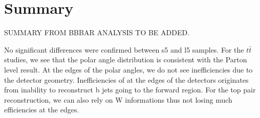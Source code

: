 \documentclass[preprint]{elsarticle}
\newcommand{\qgsp}{{\sc qgsp\_bert}}
\newcommand{\ftfp}{{\sc ftfp\_bert}}
\newcommand{\qbbc}{{\sc qbbc}}
\begin{document}







\section{Summary}


SUMMARY FROM BBBAR ANALYSIS TO BE ADDED.

No significant differences were confirmed between s5 and l5 samples. For the $t\bar{t}$ studies, we see that the polar angle distribution is consistent with the Parton level result. At the edges of the polar angles, we do not see inefficiencies due to the detector geometry. Inefficiencies of at the edges of the detectors originates from inability to reconstruct b jets going to the forward region. For the top pair reconstruction, we can also rely on W informations thus not losing much efficiencies at the edges.
\end{document}
